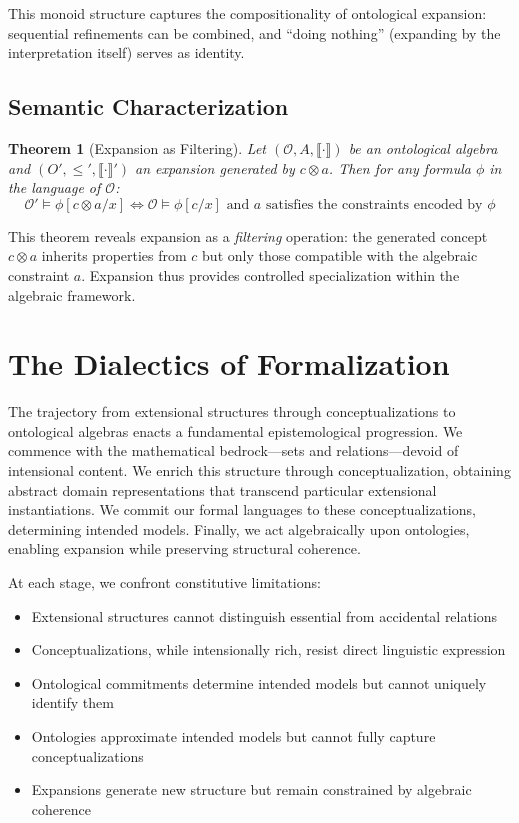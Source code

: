 \documentclass[12pt,a4paper]{article}
\newtheorem{theorem}[definition]{Theorem}
\newcommand{\onto}{\mathcal{O}}
\newcommand{\sem}[1]{\llbracket #1 \rrbracket}
\begin{document}
This monoid structure captures the compositionality of ontological expansion: sequential refinements can be combined, and ``doing nothing'' (expanding by the interpretation itself) serves as identity.

\subsection{Semantic Characterization}

\begin{theorem}[Expansion as Filtering]
Let $(\onto, A, \sem{\cdot})$ be an ontological algebra and $(O', \leq', \sem{\cdot}')$ an expansion generated by $c \otimes a$. Then for any formula $\phi$ in the language of $\onto$:
$$
\onto' \models \phi[c \otimes a / x] \iff \onto \models \phi[c/x] \text{ and } a \text{ satisfies the constraints encoded by } \phi
$$
\end{theorem}

This theorem reveals expansion as a \emph{filtering} operation: the generated concept $c \otimes a$ inherits properties from $c$ but only those compatible with the algebraic constraint $a$. Expansion thus provides controlled specialization within the algebraic framework.

\section{The Dialectics of Formalization}

The trajectory from extensional structures through conceptualizations to ontological algebras enacts a fundamental epistemological progression. We commence with the mathematical bedrock---sets and relations---devoid of intensional content. We enrich this structure through conceptualization, obtaining abstract domain representations that transcend particular extensional instantiations. We commit our formal languages to these conceptualizations, determining intended models. Finally, we act algebraically upon ontologies, enabling expansion while preserving structural coherence.

At each stage, we confront constitutive limitations:
\begin{itemize}
    \item Extensional structures cannot distinguish essential from accidental relations
    \item Conceptualizations, while intensionally rich, resist direct linguistic expression
    \item Ontological commitments determine intended models but cannot uniquely identify them
    \item Ontologies approximate intended models but cannot fully capture conceptualizations
    \item Expansions generate new structure but remain constrained by algebraic coherence
\end{itemize}
\end{document}
